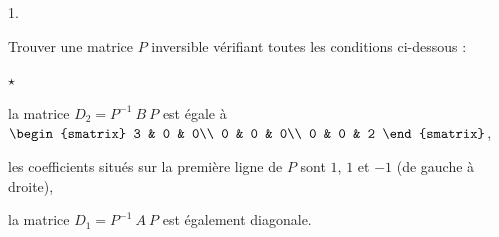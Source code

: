 \begin{noliste}{1.}
\item Trouver une matrice $P$ inversible vérifiant toutes les
  conditions ci-dessous :
  \begin{noliste}{$\star$}
  \item la matrice $D_{2} = P^{-1} \ B \ P$ est égale à
    $\begin{smatrix}
      3 & 0 & 0\\
      0 & 0 & 0\\
      0 & 0 & 2
    \end{smatrix}
    $,
  \item les coefficients situés sur la première ligne de $P$ sont $1$,
    $1$ et $-1$ (de gauche à droite),
  \item la matrice $D_{1} = P^{-1}\ A \ P$ est également diagonale.
  \end{noliste}


\end{noliste}
